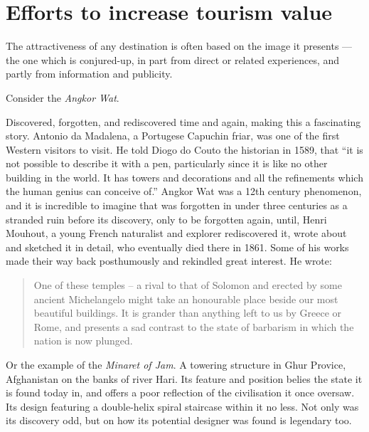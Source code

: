 \section{Efforts to increase tourism value} %
\label{sec:ettv}

The attractiveness of any destination is often based on the image it presents --- the one which is conjured-up, in part from direct or related experiences, and partly from information and publicity. 

Consider the \emph{Angkor Wat}. 

Discovered, forgotten, and rediscovered time and again, making this a fascinating story. Antonio da Madalena, a Portugese Capuchin friar, was one of the first Western visitors to visit. He told Diogo do Couto the historian in 1589, that ``it is not possible to describe it with a pen, particularly since it is like no other building in the world. It has towers and decorations and all the refinements which the human genius can conceive of.'' Angkor Wat was a 12th century phenomenon, and it is incredible to imagine that was forgotten in under three centuries as a stranded ruin before its discovery, only to be forgotten again, until, Henri Mouhout, a young French naturalist and explorer rediscovered it, wrote about and sketched it in detail, who eventually died there in 1861. Some of his works made their way back posthumously and rekindled great interest. He wrote:

\begin{quote}
  One of these temples -- a rival to that of Solomon and erected by some ancient Michelangelo might take an honourable place beside our most beautiful buildings. It is grander than anything left to us by Greece or Rome, and presents a sad contrast to the state of barbarism in which the nation is now plunged.
\end{quote}

\noindent Or the example of the \emph{Minaret of Jam}. A towering structure in Ghur Provice, Afghanistan on the banks of river Hari. Its feature and position belies the state it is found today in, and offers a poor reflection of the civilisation it once oversaw. Its design featuring a double-helix spiral staircase within it no less. Not only was its discovery odd, but on how its potential designer was found is legendary too.


